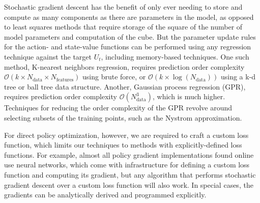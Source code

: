 \documentclass{article}
\begin{document}
Stochastic gradient descent has the benefit of only ever needing to store and compute as many components as there are parameters in the model, as opposed to least squares methods that require storage of the square of the number of model parameters and computation of the cube. But the parameter update rules for the action- and state-value functions can be performed using any regression technique against the target $U_t$, including memory-based techniques. One such method, K-nearest neighbors regression, requires prediction order complexity $\mathcal{O}(k\times N_\text{data}\times N_\text{features})$ using brute force, or $\mathcal{O}(k\times \log(N_\text{data}))$ using a k-d tree or ball tree data structure. Another, Gaussian process regression (GPR), requires prediction order complexity $\mathcal{O}(N_\text{data}^3)$, which is much higher. Techniques for reducing the order complexity of the GPR revolve around selecting subsets of the training points, such as the Nystrom approximation\cite{nystrom}. 

For direct policy optimization, however, we are required to craft a custom loss function, which limits our techniques to methods with explicitly-defined loss functions. For example, almost all policy gradient implementations found online use neural networks, which come with infrastructure for defining a custom loss function and computing its gradient, but any algorithm that performs stochastic gradient descent over a custom loss function will also work. In special cases, the gradients can be analytically derived and programmed explicitly. 
\end{document}
